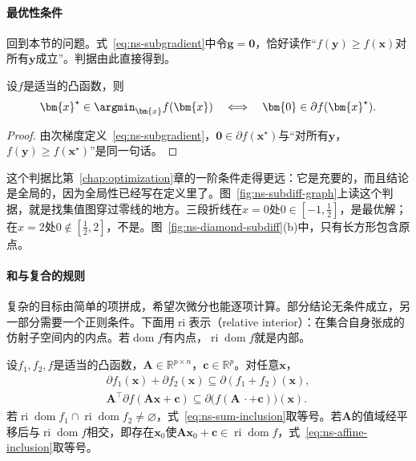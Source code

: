 \paragraph{最优性条件}
回到本节的问题。式~\eqref{eq:ns-subgradient}中令$\bm{g}=\bm{0}$，恰好读作“$f(\bm{y})\geq f(\bm{x})$对所有$\bm{y}$成立”。判据由此直接得到。

\begin{theorem}[凸目标的最优性条件]
\label{thm:ns-fermat}
设$f$是适当的凸函数，则
\begin{equation}
 \bm{x}^\star\in\argmin_{\bm{x}}f(\bm{x})\quad\Longleftrightarrow\quad\bm{0}\in\partial f(\bm{x}^\star).
 \label{eq:ns-fermat}
\end{equation}
\end{theorem}

\begin{proof}
由次梯度定义~\eqref{eq:ns-subgradient}，$\bm{0}\in\partial f(\bm{x}^\star)$与“对所有$\bm{y}$，$f(\bm{y})\geq f(\bm{x}^\star)$”是同一句话。
\end{proof}

这个判据比第~\ref{chap:optimization}章的一阶条件走得更远：它是充要的，而且结论是全局的，因为全局性已经写在定义里了。图~\ref{fig:ns-subdiff-graph}上读这个判据，就是找集值图穿过零线的地方。三段折线在$x=0$处$0\in[-1,\tfrac12]$，是最优解；在$x=2$处$0\notin[\tfrac12,2]$，不是。图~\ref{fig:ns-diamond-subdiff}(b)中，只有长方形包含原点。

\paragraph{和与复合的规则}
复杂的目标由简单的项拼成，希望次微分也能逐项计算。部分结论无条件成立，另一部分需要一个正则条件。下面用$\operatorname{ri}$表示（relative interior）：在集合自身张成的仿射子空间内的内点。若$\operatorname{dom}f$有内点，$\operatorname{ri}\operatorname{dom}f$就是内部。

\begin{theorem}[和与仿射复合]
\label{thm:ns-sum-rule}
设$f_1,f_2,f$是适当的凸函数，$\bm{A}\in\mathbb{R}^{p\times n}$，$\bm{c}\in\mathbb{R}^p$。对任意$\bm{x}$，
\begin{gather}
 \partial f_1(\bm{x})+\partial f_2(\bm{x})\subseteq\partial(f_1+f_2)(\bm{x}),\label{eq:ns-sum-inclusion}\\
 \bm{A}^\top\partial f(\bm{A}\bm{x}+\bm{c})\subseteq\partial\bigl(f(\bm{A}\,\cdot+\bm{c})\bigr)(\bm{x}).\label{eq:ns-affine-inclusion}
\end{gather}
若$\operatorname{ri}\operatorname{dom}f_1\cap\operatorname{ri}\operatorname{dom}f_2\neq\varnothing$，式~\eqref{eq:ns-sum-inclusion}取等号。若$\bm{A}$的值域经平移后与$\operatorname{ri}\operatorname{dom}f$相交，即存在$\bm{x}_0$使$\bm{A}\bm{x}_0+\bm{c}\in\operatorname{ri}\operatorname{dom}f$，式~\eqref{eq:ns-affine-inclusion}取等号。
\end{theorem}

